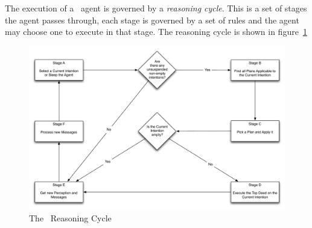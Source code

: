 \documentclass[a4]{article}
\begin{document}
The execution of a \gwendolen\ agent is governed by a \emph{reasoning cycle}.  This is a set of stages the agent passes through, each stage is governed by a set of rules and the agent may choose one to execute in that stage.  The reasoning cycle is shown in figure~\ref{fig:reasoning_cycle}
\begin{figure}
\includegraphics[width=\textwidth]{ReasoningCycle.pdf}
\caption{The \gwendolen\ Reasoning Cycle}
\label{fig:reasoning_cycle}
\end{figure}
\end{document}
